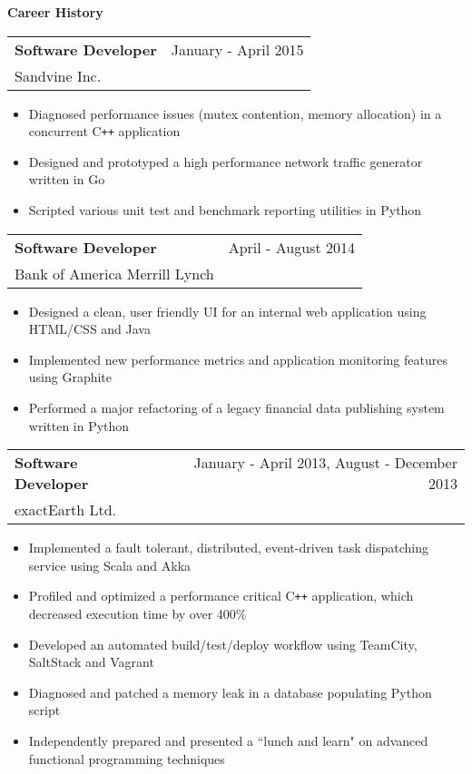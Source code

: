 \documentclass[10pt]{article}
\makeatletter
\newcommand{\resheading}[1]{{\large \colorbox{headercol}{\begin{minipage}{\textwidth}{\textbf{#1 \vphantom{p\^{E}}}}\end{minipage}}}}
\newcommand{\ressubheading}[3]{\item
\begin{tabular*}{7in}{l@{\extracolsep{\fill}}r}
    \textbf{#1} & #2 \\ #3
\end{tabular*}\vspace{-4pt}}
\makeatother
\begin{document}
\resheading{Career History}
\begin{description}
    \ressubheading{Software Developer} {January - April 2015} {Sandvine Inc.}
    \begin{itemize}
        \item{Diagnosed performance issues (mutex contention, memory allocation) in a concurrent C\texttt{++} application}
        \item{Designed and prototyped a high performance network traffic generator written in Go}
        \item{Scripted various unit test and benchmark reporting utilities in Python}
    \end{itemize}

    \ressubheading{Software Developer} {April - August 2014} {Bank of America Merrill Lynch}
    \begin{itemize}
        \item{Designed a clean, user friendly UI for an internal web application using HTML/CSS and Java}
        \item{Implemented new performance metrics and application monitoring features using Graphite}
        \item{Performed a major refactoring of a legacy financial data publishing system written in Python}
    \end{itemize}

    \ressubheading{Software Developer} {January - April 2013, August - December 2013} {exactEarth Ltd.}
    \begin{itemize}
        \item{Implemented a fault tolerant, distributed, event-driven task dispatching service using Scala and Akka}
        \item{Profiled and optimized a performance critical C\texttt{++} application, which decreased execution time by over 400\%}
        \item{Developed an automated build/test/deploy workflow using TeamCity, SaltStack and Vagrant}
        \item{Diagnosed and patched a memory leak in a database populating Python script}
        \item{Independently prepared and presented a ``lunch and learn" on advanced functional programming techniques}
    \end{itemize}


\end{description}
\end{document}
